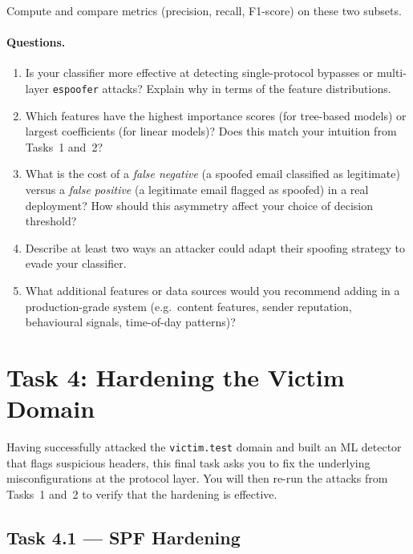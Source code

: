 \documentclass[11pt]{article}
\begin{document}
Compute and compare metrics (precision, recall, F1-score) on these two
subsets.

\paragraph{Questions.}
\begin{enumerate}[noitemsep]
  \item Is your classifier more effective at detecting single-protocol
        bypasses or multi-layer \texttt{espoofer} attacks? Explain why
        in terms of the feature distributions.
  \item Which features have the highest importance scores (for
        tree-based models) or largest coefficients (for linear models)?
        Does this match your intuition from Tasks~1 and~2?
  \item What is the cost of a \emph{false negative} (a spoofed email
        classified as legitimate) versus a \emph{false positive} (a
        legitimate email flagged as spoofed) in a real deployment?
        How should this asymmetry affect your choice of decision
        threshold?
  \item Describe at least two ways an attacker could adapt their
        spoofing strategy to evade your classifier.
  \item What additional features or data sources would you recommend
        adding in a production-grade system (e.g.\ content features,
        sender reputation, behavioural signals, time-of-day patterns)?
\end{enumerate}

\section{Task 4: Hardening the Victim Domain}

Having successfully attacked the \texttt{victim.test} domain and built
an ML detector that flags suspicious headers, this final task asks you
to fix the underlying misconfigurations at the protocol layer.
You will then re-run the attacks from Tasks~1 and~2 to verify that the
hardening is effective.

\subsection{Task 4.1 --- SPF Hardening}
\end{document}
